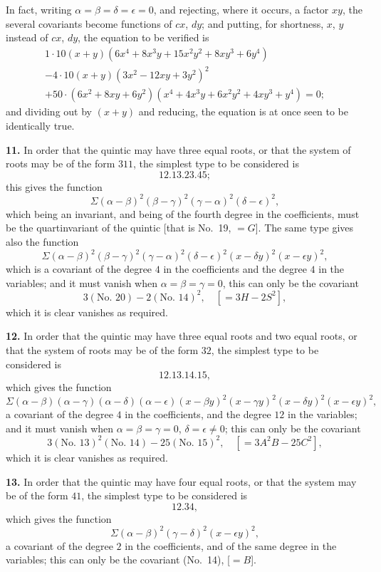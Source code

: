 \documentclass[12pt,a4paper]{article}
\theoremstyle{definition}
\begin{document}
In fact, writing $\alpha=\beta=\delta=\epsilon=0$, and rejecting, where it occurs, a factor $xy$, the several covariants become functions of $cx$, $dy$; and putting, for shortness, $x$, $y$ instead of $cx$, $dy$, the equation to be verified is
\begin{multline*}
1 \cdot 10(x+y)(6x^4 + 8x^3y + 15x^2y^2 + 8xy^3 + 6y^4) \\
- 4 \cdot 10(x+y)(3x^2 - 12xy + 3y^2)^2 \\
+ 50 \cdot (6x^2 + 8xy + 6y^2)(x^4 + 4x^3y + 6x^2y^2 + 4xy^3 + y^4) = 0;
\end{multline*}
and dividing out by $(x+y)$ and reducing, the equation is at once seen to be identically true.

\medskip
\noindent\textbf{11.} In order that the quintic may have three equal roots, or that the system of roots may be of the form $311$, the simplest type to be considered is
\[12.13.23.45;\]
this gives the function
\[
\Sigma(\alpha-\beta)^2(\beta-\gamma)^2(\gamma-\alpha)^2(\delta-\epsilon)^2,
\]
which being an invariant, and being of the fourth degree in the coefficients, must be the quartinvariant of the quintic [that is No.~19, $=G$]. The same type gives also the function
\[
\Sigma(\alpha-\beta)^2(\beta-\gamma)^2(\gamma-\alpha)^2(\delta-\epsilon)^2(x-\delta y)^2(x-\epsilon y)^2,
\]
which is a covariant of the degree $4$ in the coefficients and the degree $4$ in the variables; and it must vanish when $\alpha=\beta=\gamma=0$, this can only be the covariant
\[3(\text{No.~20}) - 2(\text{No.~14})^2, \quad [= 3H - 2S^2],\]
which it is clear vanishes as required.

\medskip
\noindent\textbf{12.} In order that the quintic may have three equal roots and two equal roots, or that the system of roots may be of the form $32$, the simplest type to be considered is
\[12.13.14.15,\]
which gives the function
\[
\Sigma(\alpha-\beta)(\alpha-\gamma)(\alpha-\delta)(\alpha-\epsilon)(x-\beta y)^2(x-\gamma y)^2(x-\delta y)^2(x-\epsilon y)^2,
\]
a covariant of the degree $4$ in the coefficients, and the degree $12$ in the variables; and it must vanish when $\alpha=\beta=\gamma=0$, $\delta=\epsilon\neq 0$; this can only be the covariant
\[3(\text{No.~13})^2(\text{No.~14}) - 25(\text{No.~15})^2, \quad [= 3A^2B - 25C^2],\]
which it is clear vanishes as required.

\medskip
\noindent\textbf{13.} In order that the quintic may have four equal roots, or that the system may be of the form $41$, the simplest type to be considered is
\[12.34,\]
which gives the function
\[
\Sigma(\alpha-\beta)^2(\gamma-\delta)^2(x-\epsilon y)^2,
\]
a covariant of the degree $2$ in the coefficients, and of the same degree in the variables; this can only be the covariant (No.~14), [$=B$].
\end{document}
